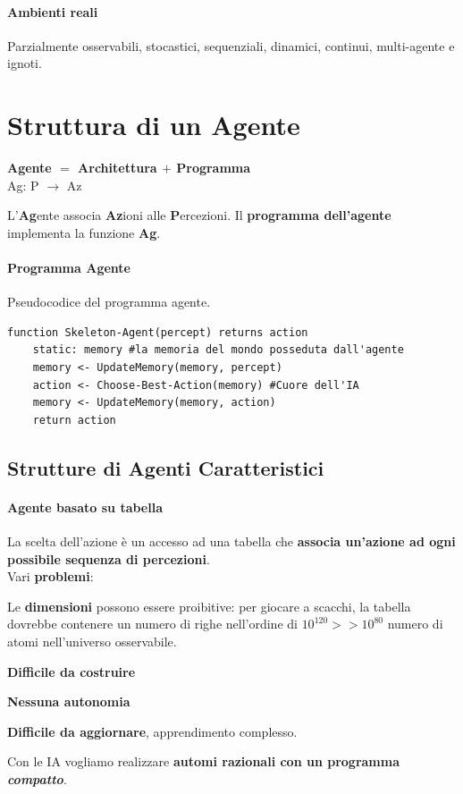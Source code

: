 \documentclass[10pt]{book}
\begin{document}
\paragraph{Ambienti reali} Parzialmente osservabili, stocastici, sequenziali, dinamici, continui, multi-agente e ignoti.
\pagebreak

\section{Struttura di un Agente}
\begin{center}
\textbf{Agente $=$ Architettura $+$ Programma}\\
Ag: P $\longrightarrow$ Az
\end{center}
L'\textbf{Ag}ente associa \textbf{Az}ioni alle \textbf{P}ercezioni. Il \textbf{programma dell'agente} implementa la funzione \textbf{Ag}.
\paragraph{Programma Agente} Pseudocodice del programma agente.
\begin{center}
\begin{lstlisting}
function Skeleton-Agent(percept) returns action
	static: memory #la memoria del mondo posseduta dall'agente
	memory <- UpdateMemory(memory, percept)
	action <- Choose-Best-Action(memory) #Cuore dell'IA
	memory <- UpdateMemory(memory, action)
	return action
\end{lstlisting}
\end{center}
\subsection{Strutture di Agenti Caratteristici}
\paragraph{Agente basato su tabella} La scelta dell'azione è un accesso ad una tabella che \textbf{associa un'azione ad ogni possibile sequenza di percezioni}.\\
Vari \textbf{problemi}:
\begin{list}{}{}
	\item Le \textbf{dimensioni} possono essere proibitive: per giocare a scacchi, la tabella dovrebbe contenere un numero di righe nell'ordine di $10^{120} >> 10^{80}$ numero di atomi nell'universo osservabile.
	\item \textbf{Difficile da costruire}
	\item \textbf{Nessuna autonomia}
	\item \textbf{Difficile da aggiornare}, apprendimento complesso.
\end{list}
Con le IA vogliamo realizzare \textbf{automi razionali con un programma \textit{compatto}}.
\end{document}
